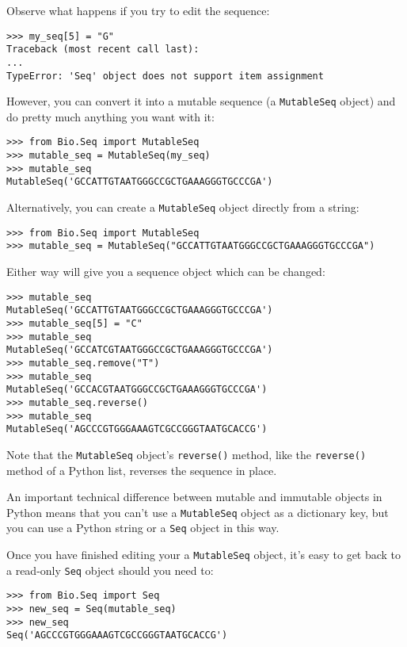 Observe what happens if you try to edit the sequence:
\begin{verbatim}
>>> my_seq[5] = "G"
Traceback (most recent call last):
...
TypeError: 'Seq' object does not support item assignment
\end{verbatim}

However, you can convert it into a mutable sequence (a \verb|MutableSeq| object) and do pretty much anything you want with it:

\begin{verbatim}
>>> from Bio.Seq import MutableSeq
>>> mutable_seq = MutableSeq(my_seq)
>>> mutable_seq
MutableSeq('GCCATTGTAATGGGCCGCTGAAAGGGTGCCCGA')
\end{verbatim}

Alternatively, you can create a \verb|MutableSeq| object directly from a string:

\begin{verbatim}
>>> from Bio.Seq import MutableSeq
>>> mutable_seq = MutableSeq("GCCATTGTAATGGGCCGCTGAAAGGGTGCCCGA")
\end{verbatim}

Either way will give you a sequence object which can be changed:

\begin{verbatim}
>>> mutable_seq
MutableSeq('GCCATTGTAATGGGCCGCTGAAAGGGTGCCCGA')
>>> mutable_seq[5] = "C"
>>> mutable_seq
MutableSeq('GCCATCGTAATGGGCCGCTGAAAGGGTGCCCGA')
>>> mutable_seq.remove("T")
>>> mutable_seq
MutableSeq('GCCACGTAATGGGCCGCTGAAAGGGTGCCCGA')
>>> mutable_seq.reverse()
>>> mutable_seq
MutableSeq('AGCCCGTGGGAAAGTCGCCGGGTAATGCACCG')
\end{verbatim}

Note that the \verb|MutableSeq| object's \verb|reverse()| method, like the \verb|reverse()| method of a Python list, reverses the sequence in place.

An important technical difference between mutable and immutable objects in Python means that you can't use a \verb|MutableSeq| object as a dictionary key, but you can use a Python string or a \verb|Seq| object in this way.

Once you have finished editing your a \verb|MutableSeq| object, it's easy to get back to a read-only \verb|Seq| object should you need to:

\begin{verbatim}
>>> from Bio.Seq import Seq
>>> new_seq = Seq(mutable_seq)
>>> new_seq
Seq('AGCCCGTGGGAAAGTCGCCGGGTAATGCACCG')
\end{verbatim}

